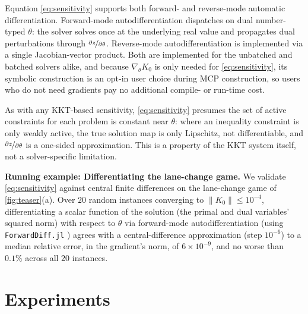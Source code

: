\documentclass[conference]{IEEEtran}
\newcommand{\contentbox}[2]{
  \begin{mdframed}[backgroundcolor=black!5,linecolor=black!60,linewidth=0.5mm]
    \vspace{0.2mm}
    {\bf Running example: #1.} #2
  \end{mdframed}
}
\begin{document}
Equation \cref{eq:sensitivity} supports both forward- and reverse-mode automatic differentiation. Forward-mode
autodifferentiation dispatches on dual number-typed $\theta$: the solver solves once at the
underlying real value and propagates dual perturbations through $\nicefrac{\partial z}{\partial
\theta}$. Reverse-mode autodifferentiation is implemented via a single
Jacobian-vector product. Both are implemented for the unbatched and batched
solvers alike, and because
$\nabla_\theta K_0$ is only needed for \cref{eq:sensitivity}, its symbolic construction is
an opt-in user choice during MCP construction, so users who do not need
gradients pay no additional compile- or run-time cost.

As with any KKT-based sensitivity, \cref{eq:sensitivity} presumes the set of
active constraints for each problem is constant near $\theta$: where an
inequality constraint is only weakly active, the true solution map
is only Lipschitz, not differentiable, and $\nicefrac{\partial z}{\partial \theta}$ is a one-sided
approximation. This is a property of the KKT system itself, not a solver-specific limitation.

\contentbox{Differentiating the lane-change game}{
  We validate \cref{eq:sensitivity} against central finite differences on the lane-change
  game of \cref{fig:teaser}(a). Over $20$ random instances converging to $\|K_0\| \le
  10^{-4}$, differentiating a scalar function of the solution (the primal and dual
  variables' squared norm) with respect to $\theta$ via forward-mode
  autodifferentiation (using \texttt{ForwardDiff.jl} \cite{RevelsLubinPapamarkou2016}) agrees with a
  central-difference approximation (step $10^{-6}$) to a median relative error, in the
  gradient's norm, of $6 \times 10^{-9}$, and no worse than $0.1\%$ across all $20$
  instances.
}

\section{Experiments}
\label{sec:experiments}
\end{document}

